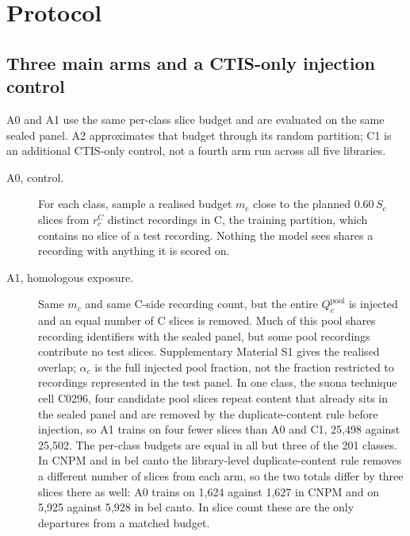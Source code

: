 \section{Protocol}\label{sec:protocol}

\subsection{Three main arms and a CTIS-only injection control}

A0 and A1 use the same per-class slice budget and are evaluated on the same sealed panel.
A2 approximates that budget through its random partition; C1 is an additional CTIS-only control,
not a fourth arm run across all five libraries.

\begin{description}
\item[A0, control.] For each class, sample a realised budget $m_c$ close to the planned
$0.60\,S_c$ slices from $r_c^{C}$ distinct recordings in C, the training partition, which contains no slice of a test recording. Nothing the model sees
shares a recording with anything it is scored on.

\item[A1, homologous exposure.] Same $m_c$ and same C-side recording count, but the entire
$Q^{\text{pool}}_c$ is injected and an equal number of C slices is removed. Much of this pool
shares recording identifiers with the sealed panel, but some pool recordings contribute no test
slices. Supplementary Material S1 gives the realised overlap; $\alpha_c$ is the full injected
pool fraction, not the fraction restricted to recordings represented in the test panel. In one
class, the suona technique cell C0296, four candidate pool slices repeat content that already sits
in the sealed panel and are removed by the duplicate-content rule before injection, so A1 trains
on four fewer slices than A0 and C1, 25{,}498 against 25{,}502. The per-class budgets are equal in
all but three of the 201 classes. In CNPM and in bel canto the library-level duplicate-content
rule removes a different number of slices from each arm, so the two totals differ by three slices
there as well: A0 trains on 1{,}624 against 1{,}627 in CNPM and on 5{,}925 against 5{,}928 in
bel canto. In slice count these are the only departures from a matched budget.


\end{description}
